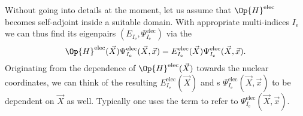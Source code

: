 \newcommand{\Iel}{I_\text{e}}
\newcommand{\Inu}{I_\text{n}}
Without going into details at the moment,
let us assume that $\Op{H}^\text{elec}$ becomes self-adjoint
inside a suitable domain.
With appropriate multi-indices $\Iel$
we can thus find its eigenpairs $(E_{\Iel}, \Psi^\text{elec}_{\Iel})$
via the 
\begin{equation}
	\Op{H}^\text{elec}(\vec{X}) \Psi^\text{elec}_{\Iel}(\vec{X}, \vec{x})
	= E^\text{elec}_{\Iel}(\vec{X})
		\Psi^\text{elec}_{\Iel}(\vec{X}, \vec{x}).
	\label{eqn:ElectronicSchrödinger}
\end{equation}
Originating from the dependence of $\Op{H}^\text{elec}(\vec{X})$
towards the nuclear coordinates,
we can think of the resulting 
$E^\text{elec}_{\Iel}(\vec{X})$
and s $\Psi^\text{elec}_{\Iel}(\vec{X}, \vec{x})$
to be dependent on $\vec{X}$ as well.
Typically one uses the term 
to refer to $\Psi^\text{elec}_{\Iel}(\vec{X}, \vec{x})$.

